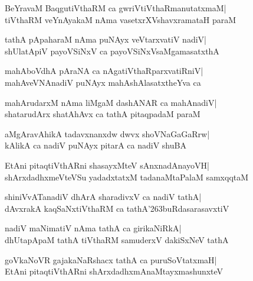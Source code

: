 \documentclass[twoside,12pt,openright]{book}
\def\S{\char'263}
\newcounter{shloka}[chapter]
\begin{document}
\begin{shloka}%
BeYravaM BaqgutiVthaRM ca gwriVtiVthaRmanutatxmaM|\\
tiVthaRM veYnAyakaM nAma vasetxrXVshavxramataH paraM
\end{shloka}

\begin{shloka}%
tathA pApaharaM nAma puNAyx veVtarxvatiV nadiV|\\
shUlatApiV payoVSiNxV ca payoVSiNxVsaMgamasatxthA
\end{shloka}

\begin{shloka}%
mahAboVdhA pAraNA ca nAgatiVthaRparxvatiRniV|\\
mahAveVNAnadiV puNAyx mahAshAlasatxtheYva ca 
\end{shloka}

\begin{shloka}%
mahArudarxM nAma liMgaM dashANAR ca mahAnadiV|\\
shatarudArx shatAhAvx ca tathA pitaqpadaM paraM
\end{shloka}

\begin{shloka}%
aMgAravAhikA tadavxnanxdw dwvx shoVNaGaGaRrw|\\
kAlikA ca nadiV puNAyx pitarA ca nadiV shuBA
\end{shloka}

\begin{shloka}%
EtAni pitaqtiVthARni shasayxMteV sAnxnadAnayoVH|\\
shArxdadhxmeVteVSu yadadxtatxM tadanaMtaPalaM samxqqtaM
\end{shloka}

\begin{shloka}%
shiniVvATanadiV dhArA sharadivxV ca nadiV tathA|\\
dAvxrakA kaqSaNxtiVthaRM ca tathA\S buRdasarasavxtiV
\end{shloka}

\begin{shloka}%
nadiV maNimatiV nAma tathA ca girikaNiRkA|\\
dhUtapApaM tathA tiVthaRM samuderxV dakiSxNeV tathA
\end{shloka}

\begin{shloka}%
goVkaNoVR gajakaNaRshacx tathA ca puruSoVtatxmaH|\\
EtAni pitaqtiVthARni shArxdadhxmAnaMtayxmashunxteV
\end{shloka}
\end{document}

